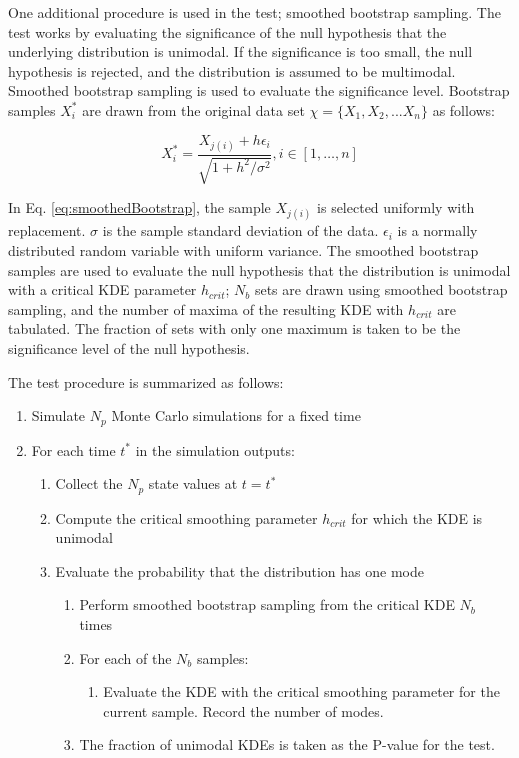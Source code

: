 \documentclass[]{article}
\begin{document}
One additional procedure is used in the test; smoothed bootstrap sampling. The test works by evaluating the significance of the null hypothesis that the underlying distribution is unimodal. If the significance is too small, the null hypothesis is rejected, and the distribution is assumed to be multimodal. Smoothed bootstrap sampling is used to evaluate the significance level. Bootstrap samples $X_i^*$ are drawn from the original data set $\chi = \{ X_1,X_2,...X_n \}$ as follows:

\begin{equation}
X_i^* = \frac{X_{j(i)} + h\epsilon_i}{\sqrt{1+h^2/\sigma^2}}, i \in [1,\dots,n]
\label{eq:smoothedBootstrap}
\end{equation}

In Eq. \ref{eq:smoothedBootstrap}, the sample $X_{j(i)}$ is selected uniformly with replacement. $\sigma$ is the sample standard deviation of the data. $\epsilon_i$ is a normally distributed random variable with uniform variance. The smoothed bootstrap samples are used to evaluate the null hypothesis that the distribution is unimodal with a critical KDE parameter $h_{crit}$; $N_b$ sets are drawn using smoothed bootstrap sampling, and the number of maxima of the resulting KDE with $h_{crit}$ are tabulated. The fraction of sets with only one maximum is taken to be the significance level of the null hypothesis.

The test procedure is summarized as follows:

\begin{enumerate}
\item Simulate $N_p$ Monte Carlo simulations for a fixed time
\item For each time $t^*$ in the simulation outputs:
\begin{enumerate}
	\item Collect the $N_p$ state values at $t = t^*$
	\item Compute the critical smoothing parameter $h_{crit}$ for which the KDE is unimodal
	\item Evaluate the probability that the distribution has one mode
	\begin{enumerate}
		\item Perform smoothed bootstrap sampling from the critical KDE $N_b$ times
		\item For each of the $N_b$ samples:
		\begin{enumerate}
			\item Evaluate the KDE with the critical smoothing parameter for the current sample. Record the number of modes.
		\end{enumerate}
		\item The fraction of unimodal KDEs is taken as the P-value for the test.	
	\end{enumerate}
\end{enumerate}
\end{enumerate}
\end{document}
